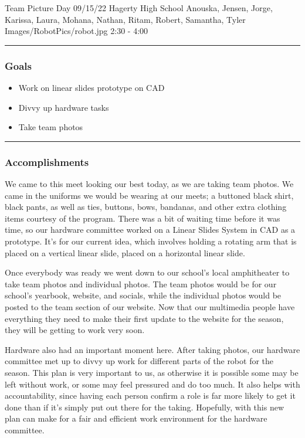 \insertmeeting 
	{Team Picture Day} 
	{09/15/22}
	{Hagerty High School}
	{Anouska, Jensen, Jorge, Karissa, Laura, Mohana, Nathan, Ritam, Robert, Samantha, Tyler}
	{Images/RobotPics/robot.jpg}
	{2:30 - 4:00}
	
\noindent\hfil\rule{\textwidth}{.4pt}\hfil
\subsubsection*{Goals}
\begin{itemize}
    \item Work on linear slides prototype on CAD
    \item Divvy up hardware tasks
    \item Take team photos

\end{itemize} 

\noindent\hfil\rule{\textwidth}{.4pt}\hfil

\subsubsection*{Accomplishments}
We came to this meet looking our best today, as we are taking team photos. We came in the uniforms we would be wearing at our meets; a buttoned black shirt, black pants, as well as ties, buttons, bows, bandanas, and other extra clothing items courtesy of the program. There was a bit of waiting time before it was time, so our hardware committee worked on a Linear Slides System in CAD as a prototype. It’s for our current idea, which involves holding a rotating arm that is placed on a vertical linear slide, placed on a horizontal linear slide. 

Once everybody was ready we went down to our school's local amphitheater to take team photos and individual photos. The team photos would be for our school's yearbook, website, and socials, while the individual photos would be posted to the team section of our website. Now that our multimedia people have everything they need to make their first update to the website for the season, they will be getting to work very soon.

Hardware also had an important moment here. After taking photos, our hardware committee met up to divvy up work for different parts of the robot for the season. This plan is very important to us, as otherwise it is possible some may be left without work, or some may feel pressured and do too much. It also helps with accountability, since having each person confirm a role is far more likely to get it done than if it's simply put out there for the taking. Hopefully, with this new plan can make for a fair and efficient work environment for the hardware committee.


